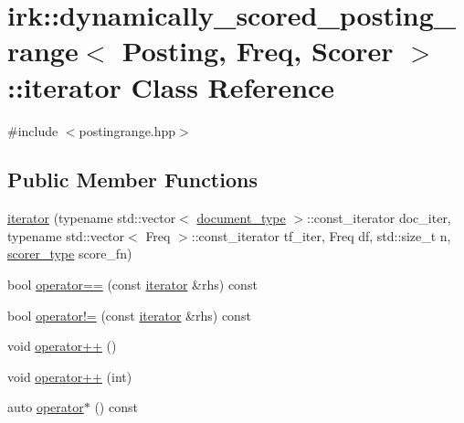 \hypertarget{classirk_1_1dynamically__scored__posting__range_1_1iterator}{}\section{irk\+:\+:dynamically\+\_\+scored\+\_\+posting\+\_\+range$<$ Posting, Freq, Scorer $>$\+:\+:iterator Class Reference}
\label{classirk_1_1dynamically__scored__posting__range_1_1iterator}


{\ttfamily \#include $<$postingrange.\+hpp$>$}

\subsection*{Public Member Functions}
\begin{DoxyCompactItemize}
\item 
\mbox{\hyperlink{classirk_1_1dynamically__scored__posting__range_1_1iterator_a05b9da8cd5f26527fd6813784579eec4}{iterator}} (typename std\+::vector$<$ \mbox{\hyperlink{classirk_1_1dynamically__scored__posting__range_a30b30964cca4601be1eab249b12bd825}{document\+\_\+type}} $>$\+::const\+\_\+iterator doc\+\_\+iter, typename std\+::vector$<$ Freq $>$\+::const\+\_\+iterator tf\+\_\+iter, Freq df, std\+::size\+\_\+t n, \mbox{\hyperlink{classirk_1_1dynamically__scored__posting__range_aa82b83ad2a96aeda0fff2cb233d877f9}{scorer\+\_\+type}} score\+\_\+fn)
\item 
bool \mbox{\hyperlink{classirk_1_1dynamically__scored__posting__range_1_1iterator_a5d73d6bd65725cd9cbdcfe6522de672c}{operator==}} (const \mbox{\hyperlink{classirk_1_1dynamically__scored__posting__range_1_1iterator}{iterator}} \&rhs) const
\item 
bool \mbox{\hyperlink{classirk_1_1dynamically__scored__posting__range_1_1iterator_ab8d1be496c6fd7a75435818004b57c1e}{operator!=}} (const \mbox{\hyperlink{classirk_1_1dynamically__scored__posting__range_1_1iterator}{iterator}} \&rhs) const
\item 
void \mbox{\hyperlink{classirk_1_1dynamically__scored__posting__range_1_1iterator_ab0b13832e06fa3f84b3db97cab912a7e}{operator++}} ()
\item 
void \mbox{\hyperlink{classirk_1_1dynamically__scored__posting__range_1_1iterator_af403756af93c1554d6aa4ba2297e6da8}{operator++}} (int)
\item 
auto \mbox{\hyperlink{classirk_1_1dynamically__scored__posting__range_1_1iterator_a27fd9b96b377548db1926ccec2d8257b}{operator$\ast$}} () const
\end{DoxyCompactItemize}


